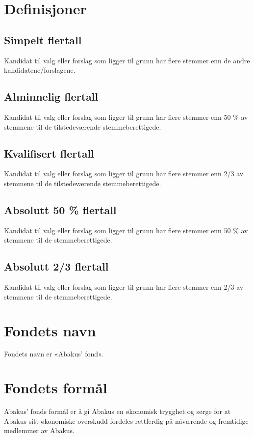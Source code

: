\section{Definisjoner}
\subsection{Simpelt flertall}
Kandidat til valg eller forslag som ligger til grunn har flere stemmer enn de
andre kandidatene/forslagene.

\subsection{Alminnelig flertall}
Kandidat til valg eller forslag som ligger til grunn har flere stemmer enn 50 \%
av stemmene til de tilstedeværende stemmeberettigede.

\subsection{Kvalifisert flertall}
Kandidat til valg eller forslag som ligger til grunn har flere stemmer enn 2/3
av stemmene til de tilstedeværende stemmeberettigede.

\subsection{Absolutt 50 \% flertall}
Kandidat til valg eller forslag som ligger til grunn har flere stemmer enn 50 \%
av stemmene til de stemmeberettigede.

\subsection{Absolutt 2/3 flertall}
Kandidat til valg eller forslag som ligger til grunn har flere stemmer enn 2/3
av stemmene til de stemmeberettigede.

\section{Fondets navn}
Fondets navn er «Abakus’ fond».

\section{Fondets formål}
Abakus’ fonds formål er å gi Abakus en økonomisk trygghet og sørge for at Abakus sitt
økonomiske overskudd fordeles rettferdig på nåværende og fremtidige medlemmer av
Abakus.

